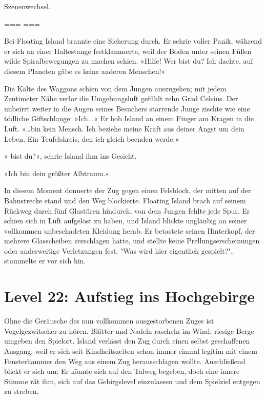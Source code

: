 Szenenwechsel.

=== ===

Bei Floating Island brannte eine Sicherung durch. Er schrie voller Panik, während er sich an einer Haltestange festklammerte, weil der Boden unter seinen Füßen wilde Spiralbewegungen zu machen schien. »Hilfe!  Wer bist du? Ich dachte, auf diesem Planeten gäbe es keine anderen Menschen!«

Die Kälte des Waggons schien von dem Jungen auszugehen; mit jedem Zentimeter Nähe verlor die Umgebungsluft gefühlt zehn Grad Celsius. Der unbeirrt weiter in die Augen seines Besuchers starrende Junge zischte wie eine tödliche Giftschlange: »Ich...« Er hob Island an einem Finger am Kragen in die Luft. »…bin kein Mensch. Ich beziehe meine Kraft aus deiner Angst um dein Leben. Ein Teufelskreis, den ich gleich beenden werde.«

» bist du?«, schrie Island ihm ins Gesicht.

»Ich bin dein größter Albtraum.«

In diesem Moment donnerte der Zug gegen einen Felsblock, der mitten auf der Bahnstrecke stand und den Weg blockierte. Floating Island brach auf seinem Rückweg durch fünf Glastüren hindurch; von dem Jungen fehlte jede Spur. Er schien sich in Luft aufgelöst zu haben, und Island blickte ungläubig an seiner vollkommen unbeschadeten Kleidung herab. Er betastete seinen Hinterkopf, der mehrere Glasscheiben zerschlagen hatte, und stellte keine Prellungserscheinungen oder anderweitige Verletzungen fest. "Was wird hier eigentlich gespielt?", stammelte er vor sich hin.


\section{Level 22: Aufstieg ins Hochgebirge}

Ohne die Geräusche des nun vollkommen ausgestorbenen Zuges ist Vogelgezwitscher zu hören. Blätter und Nadeln rascheln im Wind; riesige Berge umgeben den Spielort. Island verlässt den Zug durch einen selbst geschaffenen Ausgang, weil er sich seit Kindheitszeiten schon immer einmal legitim mit einem Fensterhammer den Weg aus einem Zug herausschlagen wollte. Anschließend blickt er sich um: Er könnte sich auf den Talweg begeben, doch eine innere Stimme rät ihm, sich auf das Gebirgslevel einzulassen und dem Spielziel entgegen zu streben.







